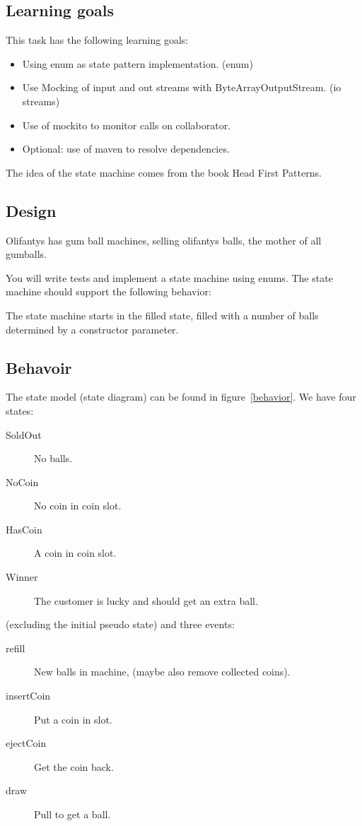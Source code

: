 \begin{multicols}{2}
  \subsection*{Learning goals}
  This task has the following learning goals:
  \begin{itemize}
  \item Using enum as state pattern implementation. (enum)
  \item Use Mocking of input and out streams with
    ByteArrayOutputStream. (io streams)
  \item Use of mockito to monitor calls on collaborator.
  \item Optional: use of maven to resolve dependencies.
  \end{itemize}

  The idea of the state machine comes from the book Head First Patterns.


  \subsection*{Design}
  Olifantys has gum ball machines, selling olifantys balls, the mother
  of all gumballs.

  You will write tests and implement a state machine using enums.
  The state machine should support the following behavior:

  The state machine starts in the filled state, filled with a number of
  balls determined by a constructor parameter.

  \subsection*{Behavoir}
  The state model (state diagram) can be found in
  figure~\ref{behavior}.
  We have four states:
  \begin{description}
  \item[SoldOut] No balls.
  \item[NoCoin] No coin in coin slot.
  \item[HasCoin] A coin in coin slot.
  \item[Winner] The customer is lucky and should get an extra ball.
  \end{description}
  (excluding the initial pseudo state) and three events:
  \begin{description}
  \item[refill] New balls in machine, (maybe also remove collected
    coins).
  \item[insertCoin] Put a coin in slot.
  \item[ejectCoin] Get the coin back.
  \item[draw] Pull to get a ball.
  \end{description}


\end{multicols}
